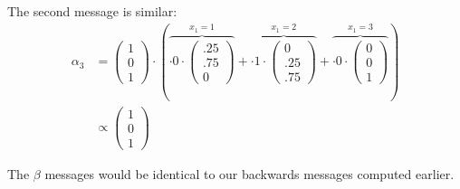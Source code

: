 \documentclass[12pt]{article}
\begin{document}
{\begin{enumerate}[(a)]
            The second message is similar:
            \begin{align*}
                \alpha_{3} &=
                \begin{pmatrix} 1 \\ 0 \\ 1 \end{pmatrix} \cdot \left(
                \overbrace{\cdot 0 \cdot \begin{pmatrix} .25 \\ .75 \\ 0 \end{pmatrix}}^{x_1 = 1} +
                \overbrace{\cdot 1 \cdot \begin{pmatrix} 0 \\ .25 \\ .75 \end{pmatrix}}^{x_1 = 2} +
                \overbrace{\cdot 0 \cdot \begin{pmatrix} 0 \\ 0 \\ 1 \end{pmatrix}}^{x_1 = 3}\right) \\
                &\propto \begin{pmatrix} 1 \\ 0 \\ 1 \end{pmatrix}
            \end{align*}

            The $\beta$ messages would be identical to our backwards messages computed earlier.
    \end{enumerate}
}
\end{document}
